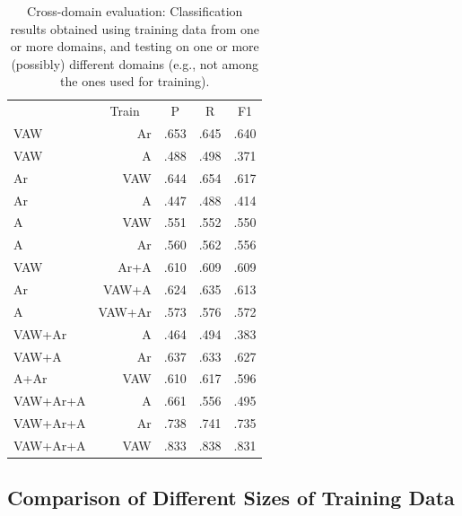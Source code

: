 \documentclass[epsfig,a4paper,12pt,titlepage]{book}
\begin{document}
\begin{table}[h]
\caption{Cross-domain evaluation: Classification results obtained using training data from one or more domains, and testing on one or more (possibly) different domains (e.g., not among the ones used for training).}
		\label{tab:14}       %
		\begin{center}
\begin{tabular}{|l|r|r|r|r|} 
\noalign{\smallskip}
\hline
\multicolumn{1}{|c|}{Test} & \multicolumn{1}{|c|}{Train} & \multicolumn{1}{|c|}{P} & \multicolumn{1}{|c|}{R}& \multicolumn{1}{|c|}{F1}  \\ 
\noalign{\smallskip}\hline\noalign{\smallskip}
VAW & Ar                    & .653 & .645 & .640   \\
VAW & A                     & .488 & .498 & .371    \\
Ar  & VAW                   & .644 & .654 & .617    \\
Ar & A                      & .447 & .488 & .414    \\
A & VAW                     & .551 & .552 & .550    \\
A & Ar                      & .560 & .562 & .556    \\
\hline
VAW & Ar+A                  & .610 & .609 & .609    \\
Ar  & VAW+A                 & .624 & .635 & .613    \\
A & VAW+Ar                  & .573 & .576 & .572    \\
\hline
VAW+Ar & A                  & .464 & .494 & .383 \\
VAW+A & Ar                  & .637 & .633 & .627 \\
A+Ar & VAW                  & .610 & .617 & .596 \\

\hline
\hline
VAW+Ar+A        & A         & .661 & .556 & .495   \\
VAW+Ar+A        & Ar        & .738 & .741 & .735    \\
VAW+Ar+A        & VAW       & .833 & .838 & .831    \\

\hline

\end{tabular}
\end{center}
\end{table}



\subsection{Comparison of Different Sizes of Training Data}
\end{document}
